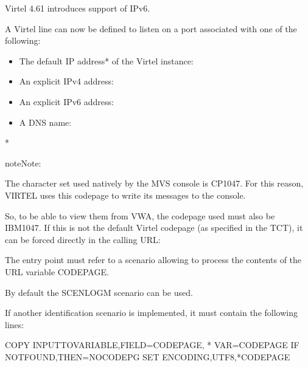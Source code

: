 \documentclass[letterpaper,10pt,english]{sphinxmanual}
\begin{document}
Virtel 4.61 introduces support of IPv6.

A Virtel line can now be defined to listen on a port associated with one of the following:
\begin{itemize}
\item {} 
The default IP address* of the Virtel instance: 

\item {} 
An explicit IPv4 address: 

\item {} 
An explicit IPv6 address: 

\item {} 
A DNS name: 

\end{itemize}

* 

\begin{sphinxadmonition}{note}{Note:}

The character set used natively by the MVS console is CP1047. For this reason, VIRTEL uses this codepage to write its messages to the console.

So, to be able to view them from VWA, the codepage used must also be IBM1047. If this is not the default Virtel codepage (as specified in the TCT), it can be forced directly in the calling URL: 

The entry point must refer to a scenario allowing to process the contents of the URL variable CODEPAGE.

By default the SCENLOGM scenario can be used.

If another identification scenario is implemented, it must contain the following lines:

\begin{sphinxVerbatim}[commandchars=\\\{\}]
COPY\PYGZdl{} INPUT\PYGZhy{}TO\PYGZhy{}VARIABLE,FIELD=\PYGZsq{}CODEPAGE\PYGZsq{},             *
      VAR=\PYGZsq{}CODEPAGE\PYGZsq{}
IF\PYGZdl{} NOT\PYGZhy{}FOUND,THEN=NOCODEPG
SET\PYGZdl{}  ENCODING,UTF\PYGZhy{}8,\PYGZsq{}*CODEPAGE\PYGZsq{}
\end{sphinxVerbatim}
\end{sphinxadmonition}
\end{document}
